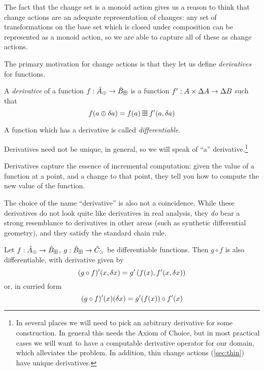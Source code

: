 The fact that the change set is a monoid action gives us a reason to think that
change actions are an adequate representation of changes: any set of
transformations on the base set which is closed under composition can be
represented as a monoid action, so we are able to capture all of these as change actions.

The primary motivation for change actions is that they let us define
\emph{derivatives} for functions.

\begin{defn}[Derivatives]
  A \emph{derivative} of a function $f: \hat{A}_\oplus \rightarrow \hat{B}_\boxplus$ is a function $f': A \times \Delta A \rightarrow
  \Delta B$ such that
  \begin{displaymath}
    f(a \oplus \delta a) = f(a) \boxplus f'(a, \delta a)
  \end{displaymath}

  A function which has a derivative is called \emph{differentiable}.
\end{defn}

Derivatives need not be unique, in general, so we will speak of ``a''
derivative.\footnote{In several places we will need to pick an arbitrary
  derivative for some construction. In general this needs the Axiom of Choice,
  but in most practical cases we will want to have a computable derivative
  operator for our domain, which alleviates the problem. In addition, thin
  change actions (\cref{sec:thin}) have unique derivatives.}

Derivatives capture the essence of incremental computation: given the value of a
function at a point, and a change to that point, they tell you how to compute
the new value of the function.

The choice of the name ``derivative'' is also not a coincidence. While these
derivatives do not look quite like derivatives in real analysis, they \emph{do}
bear a strong resemblance to derivatives in other areas (such as synthetic differential geometry), and
they satisfy the standard chain rule.

\begin{thm}
  Let $f: \hat{A}_\oplus \rightarrow \hat{B}_\boxplus$, $g: \hat{B}_\boxplus \rightarrow \hat{C}_\odot$ be differentiable functions. Then $g \circ f$ is also
  differentiable, with derivative given by
  \begin{displaymath}
    (g \circ f)'(x, \delta x) = g'\left(f(x), f'(x, \delta x)\right)
  \end{displaymath}
  or, in curried form
  \begin{displaymath}
    (g \circ f)'(x)(\delta x) = g'(f(x)) \circ f'(x)
  \end{displaymath}
\end{thm}

